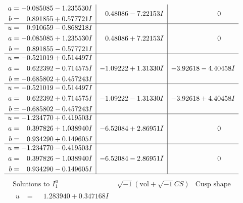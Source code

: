 \documentclass[1p]{elsarticle_modified}
\theoremstyle{definition}
\newcommand{\I}{\sqrt{-1}}
\begin{document}
$$\begin{array}{c|c|c}
\begin{aligned}
a &= -0.085085 - 1.235530 I \\
b &= \phantom{-}0.891855 + 0.577721 I\end{aligned}
 & \phantom{-}0.48086 - 7.22153 I & \phantom{-0.000000 } 0 \\ \hline\begin{aligned}
u &= \phantom{-}0.910659 - 0.868218 I \\
a &= -0.085085 + 1.235530 I \\
b &= \phantom{-}0.891855 - 0.577721 I\end{aligned}
 & \phantom{-}0.48086 + 7.22153 I & \phantom{-0.000000 } 0 \\ \hline\begin{aligned}
u &= -0.521019 + 0.514497 I \\
a &= \phantom{-}0.622392 - 0.714575 I \\
b &= -0.685802 + 0.457243 I\end{aligned}
 & -1.09222 + 1.31330 I & -3.92618 - 4.40458 I \\ \hline\begin{aligned}
u &= -0.521019 - 0.514497 I \\
a &= \phantom{-}0.622392 + 0.714575 I \\
b &= -0.685802 - 0.457243 I\end{aligned}
 & -1.09222 - 1.31330 I & -3.92618 + 4.40458 I \\ \hline\begin{aligned}
u &= -1.234770 + 0.419503 I \\
a &= \phantom{-}0.397826 + 1.038940 I \\
b &= \phantom{-}0.934290 + 0.149605 I\end{aligned}
 & -6.52084 + 2.86951 I & \phantom{-0.000000 } 0 \\ \hline\begin{aligned}
u &= -1.234770 - 0.419503 I \\
a &= \phantom{-}0.397826 - 1.038940 I \\
b &= \phantom{-}0.934290 - 0.149605 I\end{aligned}
 & -6.52084 - 2.86951 I & \phantom{-0.000000 } 0\\
 \hline 
 \end{array}$$\newpage$$\begin{array}{c|c|c}  
\text{Solutions to }I^u_{1}& \I (\text{vol} + \sqrt{-1}CS) & \text{Cusp shape}\\
 \hline 
\begin{aligned}
u &= \phantom{-}1.283940 + 0.347168 I \\

\end{aligned}
\end{array}$$
\end{document}
